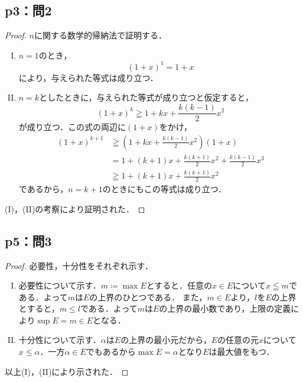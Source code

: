 \documentclass[uplatex,dvipdfmx,a4paper,10pt,fleqn]{jsarticle}
\begin{document}
\subsection*{p3：問2}

\begin{tleftbar}
    \begin{proof}
       $n$に関する数学的帰納法で証明する．
       \begin{enumerate}[(I)]
        \item $n=1$のとき，
        \[
            (1+x)^1 = 1+x
        \]
        により，与えられた等式は成り立つ．
        \item $n=k$としたときに，与えられた等式が成り立つと仮定すると，
        \[
            (1+x)^k \geqq 1+ kx + \frac{k(k-1)}{2} x^2 
        \]
        が成り立つ．この式の両辺に$(1+x)$をかけ，
        \begin{align*} 
            (1+x)^{k+1}  & \geqq \left ( 1+ kx + \frac{k(k-1)}{2} x^2 \right ) (1+x) \\
            & = 1+(k+1)x + \frac{k(k+1)}{2} x^2 + \frac{k(k-1)}{2} x^3 \\
            & \geqq 1+(k+1)x + \frac{k(k+1)}{2} x^2 
        \end{align*}
        であるから，$n =k+1$のときにもこの等式は成り立つ．
       \end{enumerate}
       (I)，(II)の考察により証明された．
    \end{proof}
\end{tleftbar}

\newpage 



\subsection*{p5：問3}

\begin{tleftbar}
    \begin{proof}
        必要性，十分性をそれぞれ示す．
        \begin{enumerate}[(I)]
            \item 必要性について示す．$m \coloneqq \max E$とすると．任意の$ x \in E$について$x \leqq m$である．よって$m$は$E$の上界のひとつである．
            また，$m \in E$より，$l$を$E$の上界とすると，$m \le l$である．よって$m$は$E$の上界の最小数であり，上限の定義により$\sup E = m \in E$となる．
            \item 十分性について示す．$\alpha$は$E$の上界の最小元だから，$E$の任意の元$x$について$x \le \alpha $．一方$\alpha  \in E$でもあるから$\max E = \alpha$となり$E$は最大値をもつ．
        \end{enumerate}
        以上(I)，(II)により示された．
    \end{proof}
    \end{tleftbar}
\end{document}
